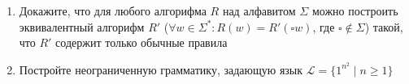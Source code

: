 \documentclass[
    11pt,
    a4paper
]{article}
\theoremstyle{definition}
\begin{document}
\begin{enumerate}
\item Докажите, что для любого алгорифма $R$ над алфавитом $\Sigma$ можно построить эквивалентный алгорифм $R'$ ($\forall w \in \Sigma^*: R(w) = R'(\square w)$, где $\square \notin \Sigma$) такой, что $R'$ содержит только обычные правила

\item Постройте неограниченную грамматику, задающую язык $\mathcal{L} = \{ 1^{n^2} \mid n \geq 1 \}$
\end{enumerate}
\end{document}
